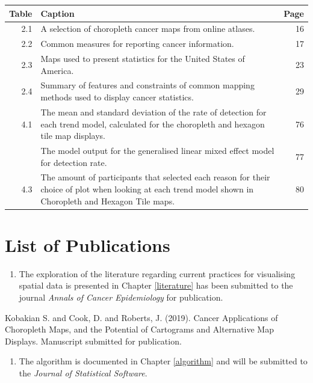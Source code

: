 \documentclass{monashthesis}
\begin{document}
\begin{tabular}{r>{\raggedright\arraybackslash}p{30em}r}
\toprule
Table & Caption & Page\\
\midrule
2.1 & A selection of choropleth cancer maps from online atlases. & 16\\
2.2 & Common measures for reporting cancer information. & 17\\
2.3 & Maps used to present statistics for the United States of America. & 23\\
2.4 & Summary of features and constraints of common mapping methods used to display
cancer statistics. & 29\\
4.1 & The mean and standard deviation of the rate of detection for each trend model, calculated for the choropleth and hexagon tile map displays. & 76\\
\addlinespace
4.2 & The model output for the generalised linear mixed effect model for detection rate. & 77\\
4.3 & The amount of participants that selected each reason for their choice of plot when looking at each trend model shown in Choropleth and Hexagon Tile maps. & 80\\
\bottomrule
\end{tabular}

\hypertarget{list-of-publications}{%
\chapter*{List of Publications}\label{list-of-publications}}

\begin{enumerate}
\def\labelenumi{\arabic{enumi}.}
\tightlist
\item
  The exploration of the literature regarding current practices for visualising spatial data is presented in Chapter \ref{literature} has been submitted to the journal \emph{Annals of Cancer Epidemiology} for publication.
\end{enumerate}

Kobakian S. and Cook, D. and Roberts, J. (2019). Cancer Applications of Choropleth Maps, and the Potential of Cartograms and Alternative Map Displays. Manuscript submitted for publication.

\begin{enumerate}
\def\labelenumi{\arabic{enumi}.}
\setcounter{enumi}{1}
\tightlist
\item
  The algorithm is documented in Chapter \ref{algorithm} and will be submitted to the \emph{Journal of Statistical Software}.
\end{enumerate}
\end{document}
